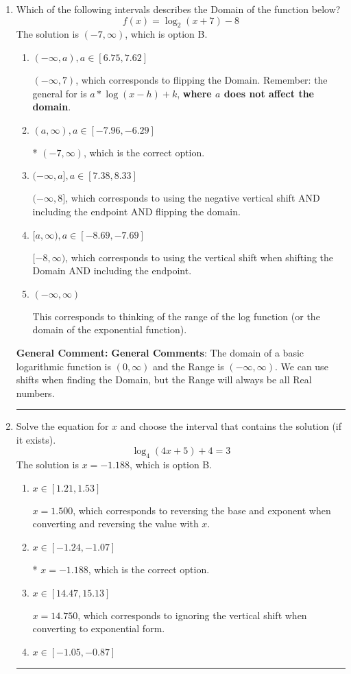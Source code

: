 \documentclass{extbook}[14pt]
\newcommand{\litem}[1]{\item #1

\rule{\textwidth}{0.4pt}}
\begin{document}
\begin{enumerate}\litem{
Which of the following intervals describes the Domain of the function below?
\[ f(x) = \log_2{(x+7)}-8 \]
The solution is \( (-7, \infty) \), which is option B.\begin{enumerate}[label=\Alph*.]
\item \( (-\infty, a), a \in [6.75, 7.62] \)

$(-\infty, 7)$, which corresponds to flipping the Domain. Remember: the general for is $a*\log(x-h)+k$, \textbf{where $a$ does not affect the domain}.
\item \( (a, \infty), a \in [-7.96, -6.29] \)

* $(-7, \infty)$, which is the correct option.
\item \( (-\infty, a], a \in [7.38, 8.33] \)

$(-\infty, 8]$, which corresponds to using the negative vertical shift AND including the endpoint AND flipping the domain.
\item \( [a, \infty), a \in [-8.69, -7.69] \)

$[-8, \infty)$, which corresponds to using the vertical shift when shifting the Domain AND including the endpoint.
\item \( (-\infty, \infty) \)

This corresponds to thinking of the range of the log function (or the domain of the exponential function).
\end{enumerate}

\textbf{General Comment:} \textbf{General Comments}: The domain of a basic logarithmic function is $(0, \infty)$ and the Range is $(-\infty, \infty)$. We can use shifts when finding the Domain, but the Range will always be all Real numbers.
}
\litem{
Solve the equation for $x$ and choose the interval that contains the solution (if it exists).
\[ \log_{4}{(4x+5)}+4 = 3 \]
The solution is \( x = -1.188 \), which is option B.\begin{enumerate}[label=\Alph*.]
\item \( x \in [1.21, 1.53] \)

$x = 1.500$, which corresponds to reversing the base and exponent when converting and reversing the value with $x$.
\item \( x \in [-1.24, -1.07] \)

* $x = -1.188$, which is the correct option.
\item \( x \in [14.47, 15.13] \)

$x = 14.750$, which corresponds to ignoring the vertical shift when converting to exponential form.
\item \( x \in [-1.05, -0.87] \)


\end{enumerate}}
\end{enumerate}
\end{document}

